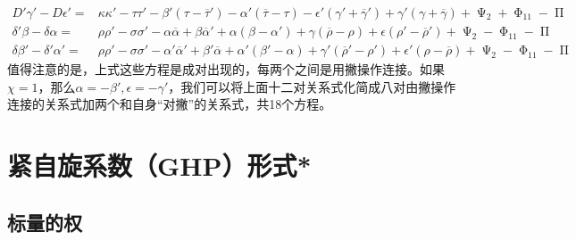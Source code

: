 {\begin{align*}
		D'\gamma '-D\epsilon '= & \kappa \kappa '-\tau \tau '-\beta '( \tau -\overline{\tau } ') -\alpha '(\overline{\tau } -\tau )-\epsilon '( \gamma '+\overline{\gamma } ') +\gamma '(\gamma +\overline{\gamma } )+\upPsi _{2} +\upPhi _{11} -\upPi \\
		\delta '\beta -\delta \alpha = & \rho \rho '-\sigma \sigma '-\alpha \overline{\alpha } +\beta \overline{\alpha } '+\alpha ( \beta -\alpha ') +\gamma (\overline{\rho } -\rho )+\epsilon ( \rho '-\overline{\rho } ') +\upPsi _{2} -\upPhi _{11} -\upPi \\
		\delta \beta '-\delta '\alpha '= & \rho \rho '-\sigma \sigma '-\alpha '\overline{\alpha } '+\beta '\overline{\alpha } +\alpha '( \beta '-\alpha ) +\gamma '(\overline{\rho } '-\rho ') +\epsilon '(\rho -\overline{\rho } )+\upPsi _{2} -\upPhi _{11} -\upPi 
\end{align*}}
值得注意的是，上式这些方程是成对出现的，每两个之间是用撇操作连接。如果$\chi =1$，那么$\alpha =-\beta ',\epsilon =-\gamma '$，我们可以将上面十二对关系式化简成八对由撇操作连接的关系式加两个和自身“对撇”的关系式，共18个方程。


\section{紧自旋系数（GHP）形式*}
\subsection{标量的权}

